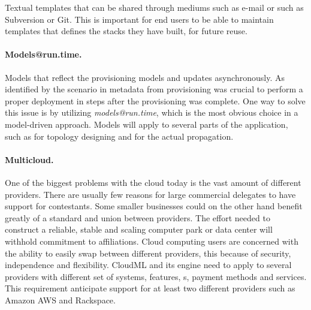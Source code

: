Textual templates that can be shared through mediums such as e-mail or 
 such as Subversion or Git.
This is important for end users to be able to maintain templates that defines the stacks they have built, for future reuse.

\paragraph{Models@run.time.}
Models that reflect the provisioning models and updates asynchronously. 
As identified by the scenario in  metadata from provisioning was crucial to perform
a proper deployment in steps after the provisioning was complete.
One way to solve this issue is by utilizing \emph{models@run.time}, which is the most obvious choice in a
model-driven approach.
Models will apply to several parts of the application, such as for topology designing and for the actual propagation.

\paragraph{Multicloud.}
One of the biggest problems with the cloud today is the vast amount of different providers. 
There are usually few reasons for large commercial delegates to have support for contestants. 
Some smaller businesses could on the other hand benefit greatly of a standard and union 
between providers.
The effort needed to construct a reliable, stable and scaling computer park or data center will 
withhold commitment to affiliations. 
Cloud computing users are concerned with the ability to easily swap between different providers, 
this because of security, 
independence and flexibility. 
CloudML and its engine need to apply to several providers with different set of systems, 
features, s, payment methods and services. This requirement anticipate support for at least two different providers such as Amazon AWS and Rackspace.
